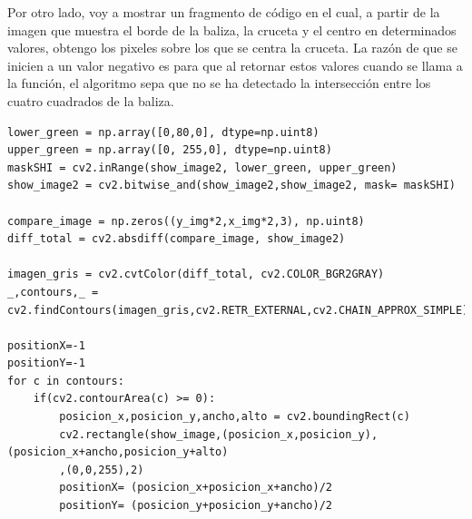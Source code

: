 \hspace{1cm} Por otro lado, voy a mostrar un fragmento de c\'odigo en el cual, a partir de la imagen que muestra el borde de la baliza, la cruceta y el centro en determinados valores, obtengo los pixeles sobre los que se centra la cruceta. La raz\'on de que se inicien a un valor negativo es para que al retornar estos valores cuando se llama a la funci\'on, el algoritmo sepa que no se ha detectado la intersecci\'on entre los cuatro cuadrados de la baliza. 


\begin{verbatim}
lower_green = np.array([0,80,0], dtype=np.uint8) 
upper_green = np.array([0, 255,0], dtype=np.uint8) 
maskSHI = cv2.inRange(show_image2, lower_green, upper_green)
show_image2 = cv2.bitwise_and(show_image2,show_image2, mask= maskSHI)

compare_image = np.zeros((y_img*2,x_img*2,3), np.uint8)
diff_total = cv2.absdiff(compare_image, show_image2)

imagen_gris = cv2.cvtColor(diff_total, cv2.COLOR_BGR2GRAY)
_,contours,_ = cv2.findContours(imagen_gris,cv2.RETR_EXTERNAL,cv2.CHAIN_APPROX_SIMPLE)

positionX=-1
positionY=-1
for c in contours:
    if(cv2.contourArea(c) >= 0):
        posicion_x,posicion_y,ancho,alto = cv2.boundingRect(c) 
        cv2.rectangle(show_image,(posicion_x,posicion_y),(posicion_x+ancho,posicion_y+alto)
        ,(0,0,255),2)
        positionX= (posicion_x+posicion_x+ancho)/2
        positionY= (posicion_y+posicion_y+ancho)/2
\end{verbatim}

